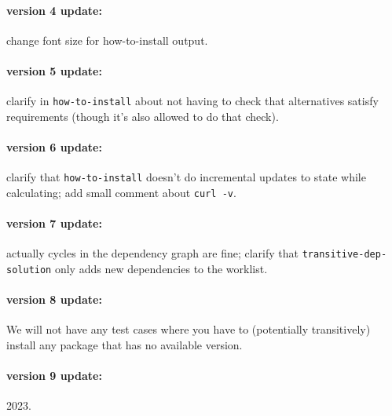 \documentclass[12pt]{article}
\renewcommand{\_}{\kern-1.5pt\textunderscore\kern-1.5pt}
\begin{document}
\paragraph{version 4 update:} change font size for how-to-install output.

\paragraph{version 5 update:} clarify in \texttt{how-to-install} about not having to check that alternatives satisfy requirements (though it's also allowed to do that check).

\paragraph{version 6 update:} clarify that \texttt{how-to-install} doesn't do incremental updates to state while calculating; add small comment about \verb+curl -v+.

\paragraph{version 7 update:} actually cycles in the dependency graph are fine; clarify that \texttt{transitive-dep-solution} only adds new dependencies to the worklist.

\paragraph{version 8 update:} We will not have any test cases where you have to (potentially transitively) install any package that has no available version.

\paragraph{version 9 update:} 2023.
\end{document}
